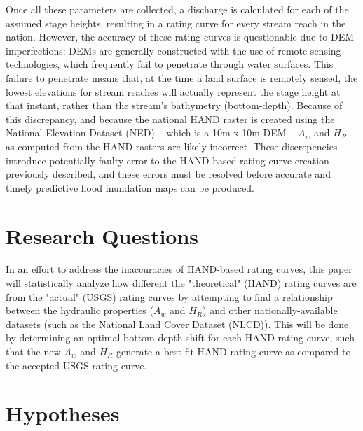 \documentclass[11pt]{article}
\begin{document}
Once all these parameters are collected, a discharge is calculated for each of the assumed stage heights, resulting in a rating curve for every stream reach in the nation. However, the accuracy of these rating curves is questionable due to DEM imperfections: DEMs are generally constructed with the use of remote sensing technologies, which frequently fail to penetrate through water surfaces. This failure to penetrate means that, at the time a land surface is remotely sensed, the lowest elevations for stream reaches will actually represent the stage height at that instant, rather than the stream's bathymetry (bottom-depth). Because of this discrepancy, and because the national HAND raster is created using the National Elevation Dataset (NED) -- which is a 10m x 10m DEM -- $A_w$ and $H_R$ as computed from the HAND rasters are likely incorrect. These discrepencies introduce potentially faulty error to the HAND-based rating curve creation previously described, and these errors must be resolved before accurate and timely predictive flood inundation maps can be produced. 


\section*{Research Questions} %

In an effort to address the inaccuracies of HAND-based rating curves, this paper will statistically analyze how different the "theoretical" (HAND) rating curves are from the "actual" (USGS) rating curves by attempting to find a relationship between the hydraulic properties ($A_w$ and $H_R$) and other nationally-available datasets (such as the National Land Cover Dataset (NLCD)). This will be done by determining an optimal bottom-depth shift for each HAND rating curve, such that the new $A_w$ and $H_R$ generate a best-fit HAND rating curve as compared to the accepted USGS rating curve. 

\section*{Hypotheses} %
\end{document}
